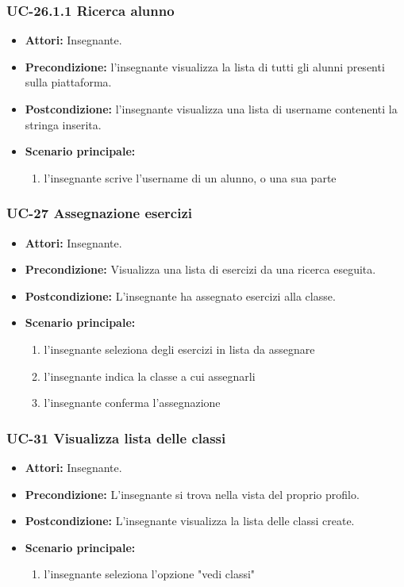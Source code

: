 \subsubsection{UC-26.1.1 Ricerca alunno}
\begin{itemize}
	\item \textbf{Attori:} Insegnante.
	\item \textbf{Precondizione:} l'insegnante visualizza la lista di tutti gli alunni presenti sulla piattaforma.
	\item \textbf{Postcondizione:} l'insegnante visualizza una lista di username contenenti la stringa inserita.
	\item \textbf{Scenario principale:}
	\begin{enumerate}
		\item l'insegnante scrive l'username di un alunno, o una sua parte
	\end{enumerate}
\end{itemize}

\subsubsection{UC-27 Assegnazione esercizi}
\begin{itemize}
	\item \textbf{Attori:} Insegnante.
	\item \textbf{Precondizione:} Visualizza una lista di esercizi da una ricerca eseguita.
	\item \textbf{Postcondizione:} L'insegnante ha assegnato esercizi alla classe.
	\item \textbf{Scenario principale:}
	\begin{enumerate}
		\item l'insegnante seleziona degli esercizi in lista da assegnare
		\item l'insegnante indica la classe a cui assegnarli
		\item l'insegnante conferma l'assegnazione
	\end{enumerate}
\end{itemize}

\subsubsection{UC-31 Visualizza lista delle classi}		
\begin{itemize}
	\item \textbf{Attori:} Insegnante.
	\item \textbf{Precondizione:} L'insegnante si trova nella vista del proprio profilo.
	\item \textbf{Postcondizione:} L'insegnante visualizza la lista delle classi create.
	\item \textbf{Scenario principale:}
	\begin{enumerate}
		\item l'insegnante seleziona l'opzione "vedi classi"
	\end{enumerate}		
\end{itemize}

